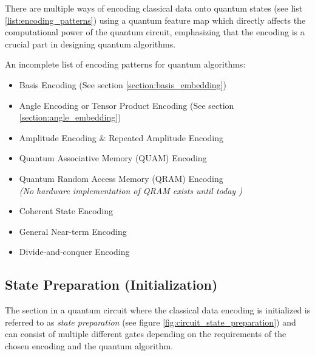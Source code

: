 There are multiple ways of encoding classical data onto quantum states (see list \ref{list:encoding_patterns}) using a quantum feature map which directly affects the computational power of the quantum circuit, emphasizing that the encoding is a crucial part in designing quantum algorithms.\cite{Quantum_machine_learning_in_feature_Hilbert_spaces_2019,Supervised_learning_with_quantum-enhanced_feature_spaces_2019,Quantum_embeddings_for_machine_learning_2020,PennyLane_QuantumEmbedding,PennyLane_QuantumFeatureMap,schuld2021supervised,leymann2019pattern}\par
\par
\noindent An incomplete list of encoding patterns for quantum algorithms\cite{schuld2021supervised,Weigold2021_ExpandingDataEncodingPatterns,leymann2019pattern}: \label{list:encoding_patterns}
\begin{itemize}
    \item Basis Encoding (See section \ref{section:basis_embedding})
    \item Angle Encoding or Tensor Product Encoding (See section \ref{section:angle_embedding}) \cite{leymannBitterTruthGatebased2020}
    \item Amplitude Encoding \& Repeated Amplitude Encoding
    \item Quantum Associative Memory (QUAM) Encoding
    \item Quantum Random Access Memory (QRAM) Encoding \\\textit{(No hardware implementation of QRAM exists until today \cite{Weigold2021_ExpandingDataEncodingPatterns})}
    \item Coherent State Encoding
    \item General Near-term Encoding
    \item Divide‑and‑conquer Encoding \cite{araujoDivideandconquerAlgorithmQuantum2021}
\end{itemize}

\subsection{State Preparation (Initialization)}\label{subsection:state_preparation}

The section in a quantum circuit where the classical data encoding is initialized is referred to as \textit{state preparation}\cite{leymann2019pattern,Weigold2021_ExpandingDataEncodingPatterns} (see figure \ref{fig:circuit_state_preparation}) and can consist of multiple different gates depending on the requirements of the chosen encoding and the quantum algorithm. 

